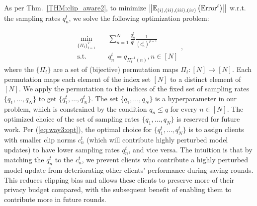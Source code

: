 As per Thm.~\ref{THM:clip_aware2}, to minimize $\left\| \mathbb{E}_{(i), (ii), (iii), (iv)}\left({\text{Error}^t}\right)\right\|$ w.r.t. the sampling rates $q_n^t$, we solve the following optimization problem:

\begin{equation}\label{eq:way3:opt}
\begin{aligned}
\min_{\{\Pi_t\}_{t=1}^T} \quad &
\sum_{n=1}^N \frac{q_n^t}{q^t}  \frac{1}{\left(c_n^t\right)^{\rho-1}}
\\
\textrm{s.t.} \quad & q_n^t = q_{\Pi_t^{-1}(n)}, n \in [N]
\end{aligned},
\end{equation}
where the $\{\Pi_t\}$ are a set of (bijective) permutation maps $\Pi_t: [N] \rightarrow [N]$.  Each permutation maps each element of the index set $[N]$ to a distinct element of $[N]$.  We apply the permutation to the indices of the fixed set of sampling rates $\{q_1,\ldots,q_N\}$ to get $\{q_1^t,\ldots,q_N^t\}$. The set $\{q_1,\ldots,q_N\}$ is a hyperparameter in our problem, which is constrained by the condition $q_n\leq q$ for every $n\in [N]$. The optimized choice of the set of sampling rates $\{q_1,\ldots,q_N\}$ is reserved for future work. Per (\ref{eq:way3:opt}), the optimal choice for $\{q_1^t,\ldots,q_N^t\}$ is to assign clients with smaller clip norms $c_n^t$ (which will contribute highly perturbed model updates) to have lower sampling rates $q_n^t$, and vice versa. The intuition is that by matching the $q_n^t$ to the $c_n^t$, we prevent clients who contribute a highly perturbed model update from deteriorating other clients' performance during saving rounds. This reduces clipping bias and allows these clients to preserve more of their privacy budget compared, with the subsequent benefit of enabling them to contribute more in future rounds.
 
